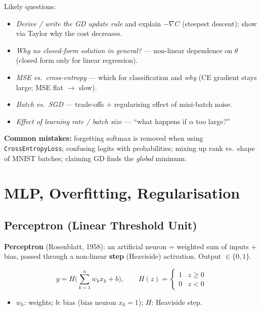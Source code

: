\documentclass[10pt,a4paper]{article}
\begin{document}
	\begin{examtipbox}
		Likely questions:
		\begin{itemize}[leftmargin=*]
			\item \emph{Derive / write the GD update rule} and explain $-\nabla C$ (steepest descent); show via Taylor why the cost decreases.
			\item \emph{Why no closed-form solution in general?} --- non-linear dependence on $\theta$ (closed form only for linear regression).
			\item \emph{MSE vs.\ cross-entropy} --- which for classification and \emph{why} (CE gradient stays large; MSE flat $\rightarrow$ slow).
			\item \emph{Batch vs.\ SGD} --- trade-offs + regularising effect of mini-batch noise.
			\item \emph{Effect of learning rate / batch size} --- ``what happens if $\alpha$ too large?''
		\end{itemize}
		\textbf{Common mistakes:} forgetting softmax is removed when using \texttt{CrossEntropyLoss}; confusing logits with probabilities; mixing up rank vs.\ shape of MNIST batches; claiming GD finds the \emph{global} minimum.
	\end{examtipbox}
	
	\section{MLP, Overfitting, Regularisation}
	
	\subsection{Perceptron (Linear Threshold Unit)}

	\begin{definitionbox}
		\textbf{Perceptron} (Rosenblatt, 1958): an artificial neuron = weighted sum of inputs + bias, passed through a non-linear \textbf{step} (Heaviside) activation. Output $\in\{0,1\}$.
	\end{definitionbox}

	\begin{formulabox}
		\[
		y = H\!\Big(\sum_{k=1}^{n} w_k x_k + b\Big), \qquad
		H(z)=\begin{cases}1 & z\ge 0\\ 0 & z<0\end{cases}
		\]
	\end{formulabox}
	\begin{itemize}[leftmargin=*]
		\item $w_k$: weights; \quad $b$: bias (bias neuron $x_0=1$); \quad $H$: Heaviside step.
	\end{itemize}
\end{document}
